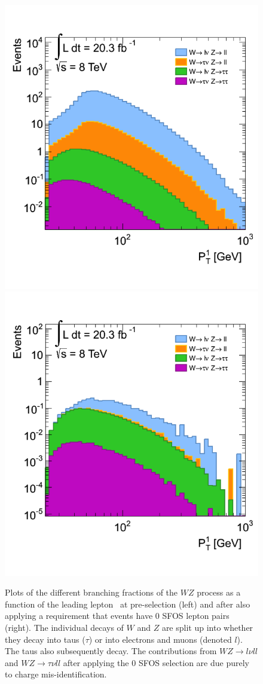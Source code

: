 \begin{figure}[ht]
\centering
\includegraphics[width=.495\textwidth]{figures/ChargeMisID/preselection_wz_br.png}
\includegraphics[width=.495\textwidth]{figures/ChargeMisID/0sfos_wz_br.png}
\caption{Plots of the different branching fractions of the $WZ$ process
as a function of the leading lepton \pt~at pre-selection (left)
and after also applying a requirement that events have 0 SFOS lepton
pairs (right). The individual decays of $W$ and $Z$ are split up
into whether they decay into taus ($\tau$) or into electrons and muons (denoted $l$).
The taus also subsequently decay. The contributions from $WZ\to l\nu ll$ 
and $WZ \to \tau \nu  ll$ after applying the 0 SFOS selection
are due purely to charge mis-identification.}
\label{fig:chargemisid_wz_br}
\end{figure}

